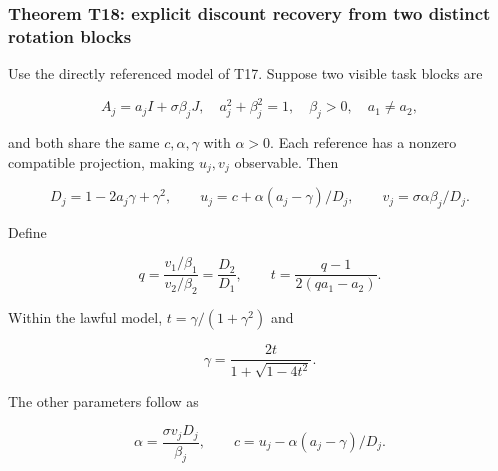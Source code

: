 \documentclass[11pt,a4paper]{article}
\begin{document}
\subsubsection{Theorem T18: explicit discount recovery from two distinct
rotation
blocks}\label{theorem-t18-explicit-discount-recovery-from-two-distinct-rotation-blocks}

\par
\noindent\begin{minipage}{\linewidth}

Use the directly referenced model of T17. Suppose two visible task
blocks are

\[
A_j=a_jI+\sigma\beta_jJ,\quad
a_j^2+\beta_j^2=1,\quad\beta_j>0,\quad a_1\ne a_2,
\]

\end{minipage}\par

\par
\noindent\begin{minipage}{\linewidth}

and both share the same \(c,\alpha,\gamma\) with \(\alpha>0\). Each
reference has a nonzero compatible projection, making \(u_j,v_j\)
observable. Then

\[
D_j=1-2a_j\gamma+\gamma^2,\qquad
u_j=c+\alpha(a_j-\gamma)/D_j,\qquad
v_j=\sigma\alpha\beta_j/D_j.
\]

\end{minipage}\par

\par
\noindent\begin{minipage}{\linewidth}

Define

\[
q=\frac{v_1/\beta_1}{v_2/\beta_2}=\frac{D_2}{D_1},
\qquad
t=\frac{q-1}{2(qa_1-a_2)}.
\]

\end{minipage}\par

\par
\noindent\begin{minipage}{\linewidth}

Within the lawful model, \(t=\gamma/(1+\gamma^2)\) and

\[
\boxed{\gamma=\frac{2t}{1+\sqrt{1-4t^2}}.}
\]

\end{minipage}\par

\par
\noindent\begin{minipage}{\linewidth}

The other parameters follow as

\[
\alpha=\frac{\sigma v_jD_j}{\beta_j},\qquad
c=u_j-\alpha(a_j-\gamma)/D_j.
\]

\end{minipage}\par
\end{document}
